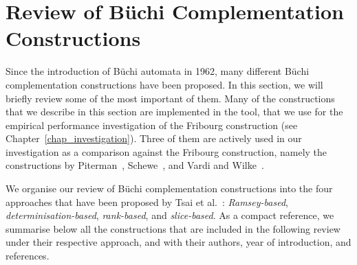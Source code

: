 \section{Review of Büchi Complementation Constructions}
\label{2_review}
Since the introduction of Büchi automata in 1962, many different Büchi complementation constructions have been proposed. In this section, we will briefly review some of the most important of them. Many of the constructions that we describe in this section are implemented in the \goal{} tool, that we use for the empirical performance investigation of the Fribourg construction (see Chapter~\ref{chap_investigation}). Three of them are actively used in our investigation as a comparison against the Fribourg construction, namely the constructions by Piterman~\cite{2006_piterman,2007_piterman}, Schewe~\cite{schewe2009buchi}, and Vardi and Wilke~\cite{vardi2007automata}.

We organise our review of Büchi complementation constructions into the four  approaches that have been proposed by Tsai et al.~\cite{2011_tsai}: \textit{Ramsey-based}, \textit{determinisation-based}, \textit{rank-based}, and \textit{slice-based}. As a compact reference, we summarise below all the constructions that are included in the following review under their respective approach, and with their authors, year of introduction, and references.

